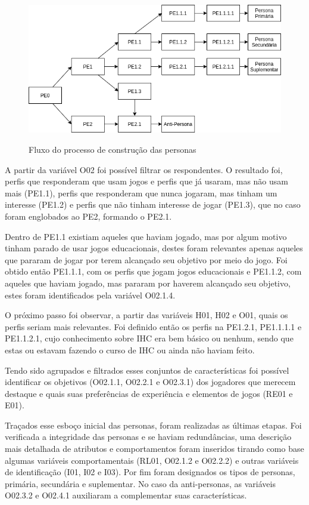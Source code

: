 \begin{apendicesenv}
\begin{figure}[htbp]
	\centering
	\caption{Fluxo do processo de construção das personas}
	\includegraphics[keepaspectratio=true,scale=0.6]{figuras/personas/persona_tree.png}
	\label{Fig:persona_tree.png}
\end{figure}

A partir da variável O02 foi possível filtrar os respondentes. O resultado foi, perfis que responderam que usam jogos e perfis que já usaram, mas não usam mais (PE1.1), perfis que responderam que nunca jogaram, mas tinham um interesse (PE1.2) e perfis que não tinham interesse de jogar (PE1.3), que no caso foram englobados ao PE2, formando o PE2.1.

Dentro de PE1.1 existiam aqueles que haviam jogado, mas por algum motivo tinham parado de usar jogos educacionais, destes foram relevantes apenas aqueles que pararam de jogar por terem alcançado seu objetivo por meio do jogo. Foi obtido então PE1.1.1, com os perfis que jogam jogos educacionais e PE1.1.2, com aqueles que haviam jogado, mas pararam por haverem alcançado seu objetivo, estes foram identificados pela variável O02.1.4.

O próximo passo foi observar, a partir das variáveis H01, H02 e O01, quais os perfis seriam mais relevantes. Foi definido então os perfis na PE1.2.1, PE1.1.1.1 e PE1.1.2.1, cujo conhecimento sobre IHC era bem básico ou nenhum, sendo que estas ou estavam fazendo o curso de IHC ou ainda não haviam feito.

Tendo sido agrupados e filtrados esses conjuntos de características foi possível identificar os objetivos (O02.1.1, O02.2.1 e O02.3.1) dos jogadores que merecem destaque e quais suas preferências de experiência e elementos de jogos (RE01 e E01). 

Traçados esse esboço inicial das personas, foram realizadas as últimas etapas. Foi verificada a integridade das personas e se haviam redundâncias, uma descrição mais detalhada de atributos e comportamentos foram inseridos tirando como base algumas variáveis comportamentais (RL01, O02.1.2 e O02.2.2) e outras variáveis de identificação (I01, I02 e I03). Por fim foram designados os tipos de personas, primária, secundária e suplementar. No caso da anti-personas, as variáveis O02.3.2 e O02.4.1 auxiliaram a complementar suas características.


\end{apendicesenv}
